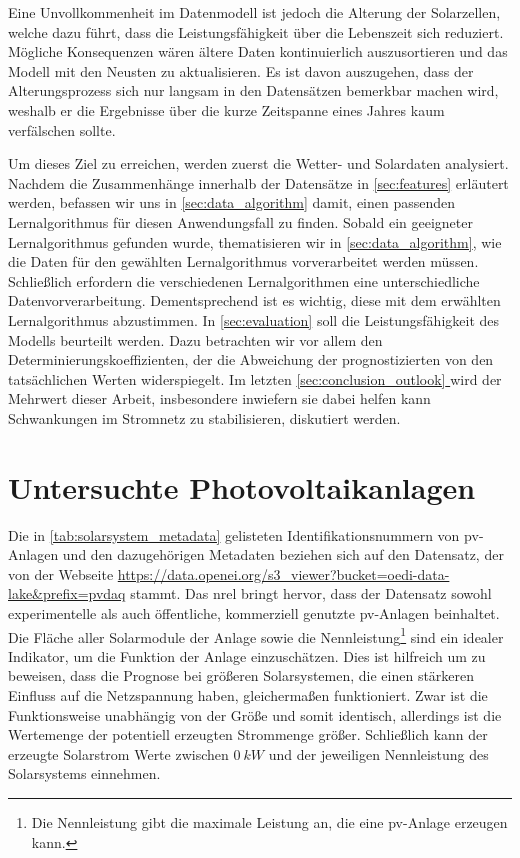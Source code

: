 \documentclass[12pt, a4paper]{article}
\newcommand*{\fullref}[1]{\hyperref[{#1}]{\autoref*{#1} \textit{\nameref*{#1}}}}
\begin{document}
Eine Unvollkommenheit im Datenmodell ist jedoch die Alterung der Solarzellen, welche dazu führt, dass die Leistungsfähigkeit über die Lebenszeit sich reduziert. Mögliche Konsequenzen wären ältere Daten kontinuierlich auszusortieren und das Modell mit den Neusten zu aktualisieren. Es ist davon auszugehen, dass der Alterungsprozess sich nur langsam in den Datensätzen bemerkbar machen wird, weshalb er die Ergebnisse über die kurze Zeitspanne eines Jahres kaum verfälschen sollte.

Um dieses Ziel zu erreichen, werden zuerst die Wetter- und Solardaten analysiert. Nachdem die Zusammenhänge innerhalb der Datensätze in \autoref{sec:features} erläutert werden, befassen wir uns in \autoref{sec:data_algorithm} damit, einen passenden Lernalgorithmus für diesen Anwendungsfall zu finden. Sobald ein geeigneter Lernalgorithmus gefunden wurde, thematisieren wir in \autoref{sec:data_algorithm}, wie die Daten für den gewählten Lernalgorithmus vorverarbeitet werden müssen. Schließlich erfordern die verschiedenen Lernalgorithmen eine unterschiedliche Datenvorverarbeitung. Dementsprechend ist es wichtig, diese mit dem erwählten Lernalgorithmus abzustimmen. In \autoref{sec:evaluation} soll die Leistungsfähigkeit des Modells beurteilt werden. Dazu betrachten wir vor allem den Determinierungskoeffizienten, der die Abweichung der prognostizierten von den tatsächlichen Werten widerspiegelt. Im letzten \fullref{sec:conclusion_outlook} wird der Mehrwert dieser Arbeit, insbesondere inwiefern sie dabei helfen kann Schwankungen im Stromnetz zu stabilisieren, diskutiert werden.
 
\newpage

\section{Untersuchte Photovoltaikanlagen}

Die in \autoref{tab:solarsystem_metadata} gelisteten Identifikationsnummern von \ac{pv}-Anlagen und den dazugehörigen Metadaten beziehen sich auf den Datensatz, der von der Webseite \url{https://data.openei.org/s3_viewer?bucket=oedi-data-lake&prefix=pvdaq} \newline stammt. Das \ac{nrel} bringt hervor, dass der Datensatz sowohl experimentelle als auch öffentliche, kommerziell genutzte \ac{pv}-Anlagen beinhaltet. Die Fläche aller Solarmodule der Anlage sowie die Nennleistung\footnote{Die Nennleistung gibt die maximale Leistung an, die eine \ac{pv}-Anlage erzeugen kann.} sind ein idealer Indikator, um die Funktion der Anlage einzuschätzen. Dies ist hilfreich um zu beweisen, dass die Prognose bei größeren Solarsystemen, die einen stärkeren Einfluss auf die Netzspannung haben, gleichermaßen funktioniert. Zwar ist die Funktionsweise unabhängig von der Größe und somit identisch, allerdings ist die Wertemenge der potentiell erzeugten Strommenge größer. Schließlich kann der erzeugte Solarstrom Werte zwischen $0 \ kW$ und der jeweiligen Nennleistung des Solarsystems einnehmen. 
\end{document}
